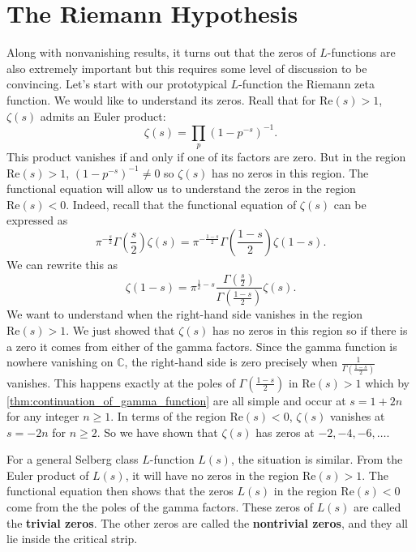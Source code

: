 \documentclass[12pt]{book}
\theoremstyle{definition}\newframedtheorem{method}{Method}
\newcommand{\C}{\mathbb{C}}
\newcommand{\z}{\zeta}
\newcommand{\G}{\Gamma}
\newcommand{\<}{\langle}
\renewcommand{\>}{\rangle}
\renewcommand{\Re}{\mathrm{Re}}
\begin{document}
  \section{The Riemann Hypothesis}
    Along with nonvanishing results, it turns out that the zeros of $L$-functions are also extremely important but this requires some level of discussion to be convincing. Let's start with our prototypical $L$-function the Riemann zeta function. We would like to understand its zeros. Reall that for $\Re(s) > 1$, $\z(s)$ admits an Euler product:
    \[
      \z(s) = \prod_{p}(1-p^{-s})^{-1}.
    \]
    This product vanishes if and only if one of its factors are zero. But in the region $\Re(s) > 1$, $(1-p^{-s})^{-1} \neq 0$ so $\z(s)$ has no zeros in this region. The functional equation will allow us to understand the zeros in the region $\Re(s) < 0$. Indeed, recall that the functional equation of $\z(s)$ can be expressed as
    \[
      \pi^{-\frac{s}{2}}\G\left(\frac{s}{2}\right)\z(s) = \pi^{-\frac{1-s}{2}}\G\left(\frac{1-s}{2}\right)\z(1-s).
    \]
    We can rewrite this as
    \[
      \z(1-s) = \pi^{\frac{1}{2}-s}\frac{\G\left(\frac{s}{2}\right)}{\G\left(\frac{1-s}{2}\right)}\z(s).
    \]
    We want to understand when the right-hand side vanishes in the region $\Re(s) > 1$. We just showed that $\z(s)$ has no zeros in this region so if there is a zero it comes from either of the gamma factors. Since the gamma function is nowhere vanishing on $\C$, the right-hand side is zero precisely when $\frac{1}{\G\left(\frac{1-s}{2}\right)}$ vanishes. This happens exactly at the poles of $\G\left(\frac{1-s}{2}\right)$ in $\Re(s) > 1$ which by \cref{thm:continuation_of_gamma_function} are all simple and occur at $s = 1+2n$ for any integer $n \ge 1$. In terms of the region $\Re(s) < 0$, $\z(s)$ vanishes at $s = -2n$ for $n \ge 2$. So we have shown that $\z(s)$ has zeros at $-2,-4,-6,\ldots$.

    For a general Selberg class $L$-function $L(s)$, the situation is similar. From the Euler product of $L(s)$, it will have no zeros in the region $\Re(s) > 1$. The functional equation then shows that the zeros $L(s)$ in the region $\Re(s) < 0$ come from the the poles of the gamma factors. These zeros of $L(s)$ are called the \textbf{trivial zeros}. The other zeros are called the \textbf{nontrivial zeros}, and they all lie inside the critical strip.
\end{document}

